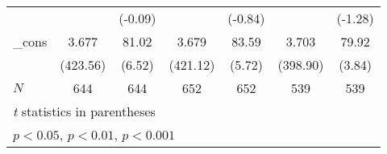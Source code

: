 {\begin{tabular}{l*{6}{c}}
            &                     &     (-0.09)         &                     &     (-0.84)         &                     &     (-1.28)         \\
[1em]
\_cons      &       3.677\sym{***}&       81.02\sym{***}&       3.679\sym{***}&       83.59\sym{***}&       3.703\sym{***}&       79.92\sym{***}\\
            &    (423.56)         &      (6.52)         &    (421.12)         &      (5.72)         &    (398.90)         &      (3.84)         \\
\hline
\(N\)       &         644         &         644         &         652         &         652         &         539         &         539         \\
\hline\hline
\multicolumn{7}{l}{\footnotesize \textit{t} statistics in parentheses}\\
\multicolumn{7}{l}{\footnotesize \sym{*} \(p<0.05\), \sym{**} \(p<0.01\), \sym{***} \(p<0.001\)}\\
\end{tabular}
}
